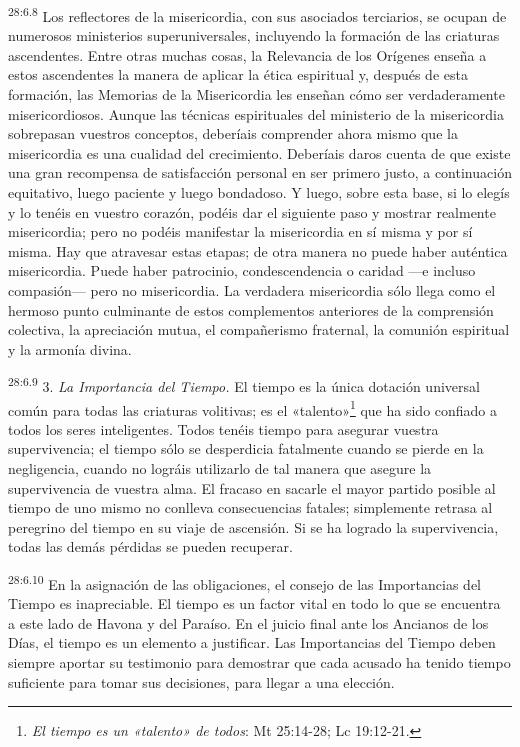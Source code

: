 \par
\textsuperscript{28:6.8} Los reflectores de la misericordia, con sus asociados terciarios, se ocupan de numerosos ministerios superuniversales, incluyendo la formación de las criaturas ascendentes. Entre otras muchas cosas, la Relevancia de los Orígenes enseña a estos ascendentes la manera de aplicar la ética espiritual y, después de esta formación, las Memorias de la Misericordia les enseñan cómo ser verdaderamente misericordiosos. Aunque las técnicas espirituales del ministerio de la misericordia sobrepasan vuestros conceptos, deberíais comprender ahora mismo que la misericordia es una cualidad del crecimiento. Deberíais daros cuenta de que existe una gran recompensa de satisfacción personal en ser primero justo, a continuación equitativo, luego paciente y luego bondadoso. Y luego, sobre esta base, si lo elegís y lo tenéis en vuestro corazón, podéis dar el siguiente paso y mostrar realmente misericordia; pero no podéis manifestar la misericordia en sí misma y por sí misma. Hay que atravesar estas etapas; de otra manera no puede haber auténtica misericordia. Puede haber patrocinio, condescendencia o caridad ---e incluso compasión--- pero no misericordia. La verdadera misericordia sólo llega como el hermoso punto culminante de estos complementos anteriores de la comprensión colectiva, la apreciación mutua, el compañerismo fraternal, la comunión espiritual y la armonía divina.

\par
\textsuperscript{28:6.9} 3. \textit{La Importancia del Tiempo.} El tiempo es la única dotación universal común para todas las criaturas volitivas; es el «talento»\footnote{\textit{El tiempo es un «talento» de todos}: Mt 25:14-28; Lc 19:12-21.} que ha sido confiado a todos los seres inteligentes. Todos tenéis tiempo para asegurar vuestra supervivencia; el tiempo sólo se desperdicia fatalmente cuando se pierde en la negligencia, cuando no lográis utilizarlo de tal manera que asegure la supervivencia de vuestra alma. El fracaso en sacarle el mayor partido posible al tiempo de uno mismo no conlleva consecuencias fatales; simplemente retrasa al peregrino del tiempo en su viaje de ascensión. Si se ha logrado la supervivencia, todas las demás pérdidas se pueden recuperar.

\par
\textsuperscript{28:6.10} En la asignación de las obligaciones, el consejo de las Importancias del Tiempo es inapreciable. El tiempo es un factor vital en todo lo que se encuentra a este lado de Havona y del Paraíso. En el juicio final ante los Ancianos de los Días, el tiempo es un elemento a justificar. Las Importancias del Tiempo deben siempre aportar su testimonio para demostrar que cada acusado ha tenido tiempo suficiente para tomar sus decisiones, para llegar a una elección.

